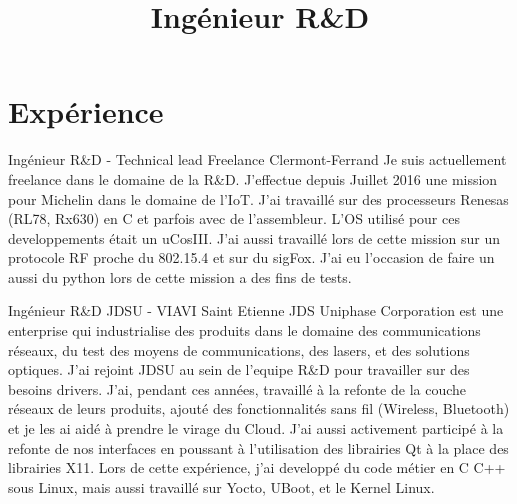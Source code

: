 \documentclass[11pt,a4paper,sans]{moderncv}
\title{Ing\'enieur R\&D}
\begin{document}
\makecvtitle

\section{Exp\'erience}

{Ing\'enieur R\&D - Technical lead}
{Freelance}
{Clermont-Ferrand}
{}
{Je suis actuellement freelance dans le domaine de la R\&D. J'effectue depuis
Juillet 2016 une mission pour Michelin dans le domaine de l'IoT. J'ai travaill\'e 
sur des processeurs Renesas (RL78, Rx630) en C et parfois avec de l'assembleur. 
L'OS utilis\'e pour ces developpements \'etait un uCosIII. J'ai aussi travaill\'e 
lors de cette mission sur un protocole RF proche du 802.15.4 et sur du sigFox. J'ai 
eu l'occasion de faire un aussi du python lors de cette mission a des fins de tests.}

{Ing\'enieur R\&D}
{JDSU - VIAVI}
{Saint Etienne}
{}
{JDS Uniphase Corporation est une enterprise qui industrialise des produits
dans le domaine des communications r\'eseaux, du test des moyens de
communications, des lasers, et des solutions optiques.
J'ai rejoint JDSU au sein de l'equipe R\&D pour travailler sur des besoins
drivers. J'ai, pendant ces ann\'ees, travaill\'e \`a la refonte de la couche
r\'eseaux de leurs produits, ajout\'e des fonctionnalit\'es sans fil
(Wireless, Bluetooth) et je les ai aid\'e \`a prendre le virage du Cloud.
J'ai aussi activement particip\'e \`a la refonte de nos interfaces en poussant
\`a l'utilisation des librairies Qt \`a la place des librairies X11.
Lors de cette exp\'erience, j'ai developp\'e du code m\'etier en C C++ sous
Linux, mais aussi travaill\'e sur Yocto, UBoot, et le Kernel Linux.
}
\end{document}
